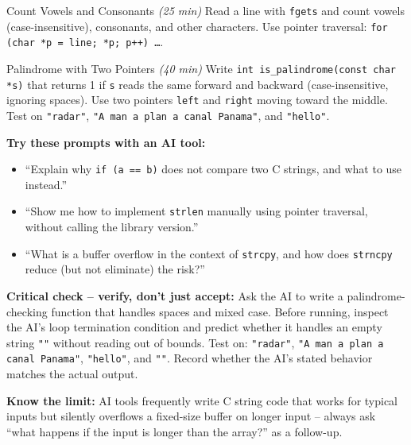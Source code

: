 \documentclass[11pt]{article}
\begin{document}
\begin{labexercise}{Count Vowels and Consonants \hfill {\small \itshape (25 min)}}
Read a line with \texttt{fgets} and count vowels (case-insensitive),
consonants, and other characters. Use pointer traversal: \texttt{for (char *p = line; *p; p++) \ldots}.
\end{labexercise}

\begin{labexercise}{Palindrome with Two Pointers \hfill {\small \itshape (40 min)}}
Write \texttt{int is\_palindrome(const char *s)} that returns 1 if \texttt{s} reads the
same forward and backward (case-insensitive, ignoring spaces). Use two pointers
\texttt{left} and \texttt{right} moving toward the middle. Test on \texttt{"radar"},
\texttt{"A man a plan a canal Panama"}, and \texttt{"hello"}.
\end{labexercise}

\begin{aicollab}
\textbf{Try these prompts with an AI tool:}
\begin{itemize}[leftmargin=*,nosep]
  \item ``Explain why \texttt{if (a == b)} does not compare two C strings, and what to
        use instead.''
  \item ``Show me how to implement \texttt{strlen} manually using pointer traversal,
        without calling the library version.''
  \item ``What is a buffer overflow in the context of \texttt{strcpy}, and how does
        \texttt{strncpy} reduce (but not eliminate) the risk?''
\end{itemize}

\medskip\textbf{Critical check -- verify, don't just accept:}
Ask the AI to write a palindrome-checking function that handles spaces and mixed case.
Before running, inspect the AI's loop termination condition and predict whether it handles
an empty string \texttt{""} without reading out of bounds.
Test on: \texttt{"radar"}, \texttt{"A man a plan a canal Panama"}, \texttt{"hello"}, and
\texttt{""}. Record whether the AI's stated behavior matches the actual output.

\medskip\textbf{Know the limit:}
AI tools frequently write C string code that works for typical inputs but silently
overflows a fixed-size buffer on longer input -- always ask ``what happens if the
input is longer than the array?'' as a follow-up.
\end{aicollab}

\takehomebanner
\end{document}
